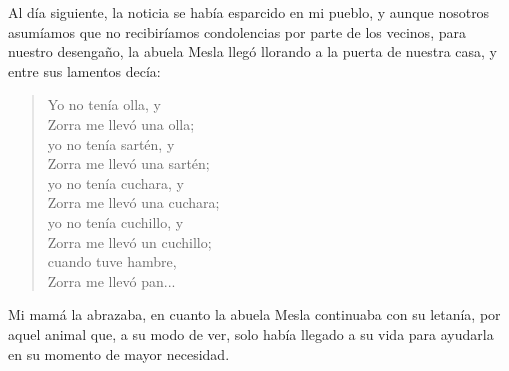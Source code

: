 Al día siguiente, la noticia se había esparcido en mi pueblo, y aunque nosotros asumíamos que no recibiríamos condolencias por parte de los vecinos, para nuestro desengaño, la abuela Mesla llegó llorando a la puerta de nuestra casa, y entre sus lamentos decía:
\begin{quotation}
\noindent Yo no tenía olla, y \\Zorra me llevó una olla;\\ 
yo no tenía sartén, y \\Zorra me llevó una sartén;\\ 
yo no tenía cuchara, y \\Zorra me llevó una cuchara;\\
yo no tenía cuchillo, y \\Zorra me llevó un cuchillo;\\
cuando tuve hambre, \\Zorra me llevó pan...  
\end{quotation}
Mi mamá la abrazaba, en cuanto la abuela Mesla continuaba con su letanía, por aquel animal que, a su modo de ver, solo había llegado a su vida para ayudarla en su momento de mayor necesidad.

